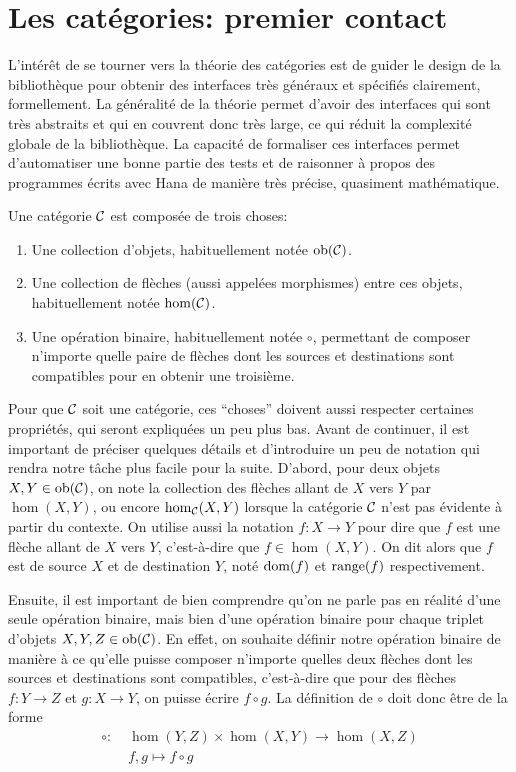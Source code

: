 \section{Les catégories: premier contact}
L'intérêt de se tourner vers la théorie des catégories est de guider le
design de la bibliothèque pour obtenir des interfaces très généraux et
spécifiés clairement, formellement. La généralité de la théorie permet
d'avoir des interfaces qui sont très abstraits et qui en couvrent donc
très large, ce qui réduit la complexité globale de la bibliothèque. La
capacité de formaliser ces interfaces permet d'automatiser une bonne partie
des tests et de raisonner à propos des programmes écrits avec Hana de manière
très précise, quasiment mathématique.

\begin{définition}[Catégorie]
    Une catégorie $\mathcal{C}$ est composée de trois choses:
    \begin{enumerate}
        \item Une collection d'objets, habituellement notée $\mathrm{ob}(\mathcal{C})$.
        \item Une collection de flèches (aussi appelées morphismes) entre ces
              objets, habituellement notée $\hom(\mathcal{C})$.
        \item Une opération binaire, habituellement notée $\circ$, permettant de
              composer n'importe quelle paire de flèches dont les sources et
              destinations sont compatibles pour en obtenir une troisième.
    \end{enumerate}
\end{définition}

Pour que $\mathcal{C}$ soit une catégorie, ces ``choses'' doivent aussi respecter
certaines propriétés, qui seront expliquées un peu plus bas. Avant de
continuer, il est important de préciser quelques détails et d'introduire
un peu de notation qui rendra notre tâche plus facile pour la suite. D'abord,
pour deux objets $X, Y \in \mathrm{ob}(\mathcal{C})$, on note la collection des flèches allant
de $X$ vers $Y$ par $\hom(X, Y)$, ou encore $\hom_{\mathcal{C}}(X, Y)$ lorsque la catégorie
$\mathcal{C}$ n'est pas évidente à partir du contexte. On utilise aussi la notation
$f : X \to Y$ pour dire que $f$ est une flèche allant de $X$ vers $Y$,
c'est-à-dire que $f \in \hom(X, Y)$. On dit alors que $f$ est de source
$X$ et de destination $Y$, noté $\mathrm{dom}(f)$ et $\mathrm{range}(f)$ respectivement.

Ensuite, il est important de bien comprendre qu'on ne parle pas en réalité
d'une seule opération binaire, mais bien d'une opération binaire pour chaque
triplet d'objets $X, Y, Z \in \mathrm{ob}(\mathcal{C})$. En effet, on souhaite définir notre
opération binaire de manière à ce qu'elle puisse composer n'importe quelles
deux flèches dont les sources et destinations sont compatibles, c'est-à-dire
que pour des flèches $f : Y \to Z$ et $g : X \to Y$, on puisse écrire
$f \circ g$. La définition de $\circ$ doit donc être de la forme
\begin{align*}
    \circ : \; &\hom(Y, Z) \times \hom(X, Y) \to \hom(X, Z) \\
               &f, g \mapsto f \circ g
\end{align*}

